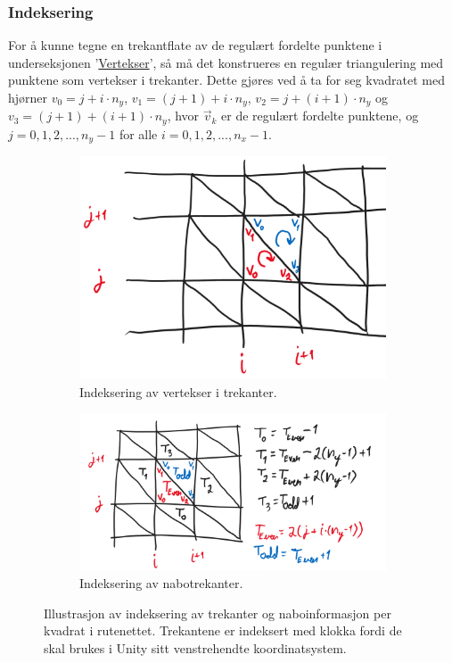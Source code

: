 \documentclass[norsk, doc, 11pt, a4paper]{apa7}  %
\begin{document}
\subsubsection{Indeksering}
For å kunne tegne en trekantflate av de regulært fordelte punktene i underseksjonen '\hyperref[M:1:1]{Vertekser}', så må det konstrueres en regulær triangulering med punktene som vertekser i trekanter. Dette gjøres ved å ta for seg kvadratet med hjørner \(v_{0} = j + i\cdot n_{y}\), \(v_{1} = (j+1) + i\cdot n_{y}\), \(v_{2} = j + (i+1)\cdot n_{y}\) og \(v_{3} = (j+1) + (i+1)\cdot n_{y}\), hvor \(\vec{v}_{k}\) er de regulært fordelte punktene, og \(j=0,1,2,...,n_{y}-1\) for alle \(i=0,1,2,...,n_{x}-1\).
\begin{figure}[H]
	\centering
	\begin{subfigure}{.5\textwidth}
		\centering
		\includegraphics[width=.6\linewidth]{figs/Indices.png}
		\caption{Indeksering av vertekser i trekanter.}
	\end{subfigure}%
	\begin{subfigure}{.5\textwidth}
		\centering
		\includegraphics[width=\linewidth]{figs/Neighbours.png}
		\caption{Indeksering av nabotrekanter.}
	\end{subfigure}
	\caption{Illustrasjon av indeksering av trekanter og naboinformasjon per kvadrat i rutenettet. Trekantene er indeksert med klokka fordi de skal brukes i Unity sitt venstrehendte koordinatsystem.}
\end{figure}
\end{document}
